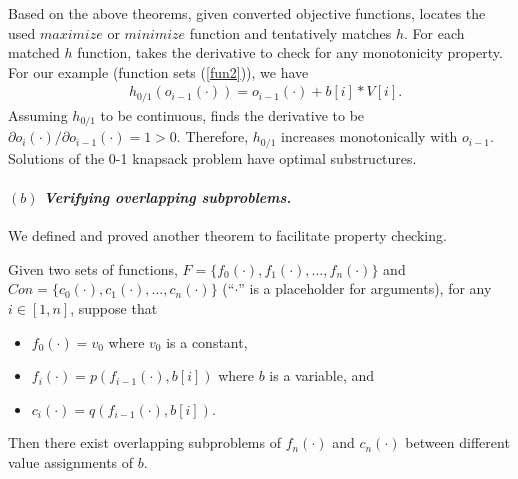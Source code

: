 
Based on the above theorems, given converted objective functions, \tool locates the used $maximize$ or $minimize$ function and tentatively matches $h$. 
For each matched $h$ function, \tool takes the derivative to check for any monotonicity property.
For our example (function sets (\ref{fun2})), we have 
\begin{align}
    & h_{0/1}(o_{i-1}(\cdot))=o_{i-1}(\cdot)+b[i]*V[i]. \nonumber
\end{align}
Assuming $h_{0/1}$ to be continuous, \tool finds the derivative to be $\partial o_i(\cdot)/\partial o_{i-1}(\cdot)=1>0$. Therefore, $h_{0/1}$ increases monotonically with $o_{i-1}$. Solutions of the 0-1 knapsack problem have   optimal substructures.  


\paragraph{$(b)$ \emph{Verifying overlapping subproblems.}} We defined and proved another theorem to facilitate property checking. 

\begin{theorem}
\label{thm2}
Given two sets of functions, $F=\{f_0(\cdot), f_1(\cdot), \ldots, f_n(\cdot)\}$ and $Con=\{c_0(\cdot), c_1(\cdot), \ldots, c_n(\cdot)\}$ (``$\cdot$'' is a placeholder for arguments), for 
any $i\in[1, n]$, suppose that 
\begin{itemize}
\item $f_0(\cdot)=v_0$ where $v_0$ is a constant, 
\item $f_i(\cdot)=p(f_{i-1}(\cdot), b[i])$ where $b$ is a variable, and
\item $c_i(\cdot)=q(f_{i-1}(\cdot), b[i])$. 
\end{itemize}
Then there exist overlapping subproblems of $f_n(\cdot)$ and $c_n(\cdot)$ 
between different value assignments of $b$.
\end{theorem}

